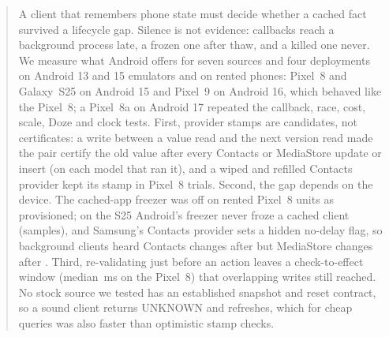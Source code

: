 \begin{abstract}
A client that remembers phone state must decide whether a cached fact survived a lifecycle gap. Silence is not evidence: callbacks reach a background process late, a frozen one after thaw, and a killed one never. We measure what Android offers for seven sources and four deployments on Android 13 and 15 emulators and on rented phones: Pixel~8 and Galaxy~S25 on Android 15 and Pixel~9 on Android 16, which behaved like the Pixel~8; a Pixel~8a on Android 17 repeated the callback, race, cost, scale, Doze and clock tests. First, provider stamps are candidates, not certificates: a write between a value read and the next version read made the pair certify the old value after every Contacts or MediaStore update or insert (\PhysRaceStampedStale on each model that ran it), and a wiped and refilled Contacts provider kept its stamp in \PhysResetSameStamp Pixel~8 trials. Second, the gap depends on the device. The cached-app freezer was off on \PhysFreezerOffTrialUnits rented Pixel~8 units as provisioned; on the S25 Android's freezer never froze a cached client (\PhysSamsungLongAndroidFrozen samples), and Samsung's Contacts provider sets a hidden no-delay flag, so background clients heard Contacts changes after \PhysSamsungBgMedian but MediaStore changes after \PhysSamsungMediaBgMedian. Third, re-validating just before an action leaves a check-to-effect window (median \PhysCteMsInt\,ms on the Pixel~8) that overlapping writes still reached. No stock source we tested has an established snapshot and reset contract, so a sound client returns UNKNOWN and refreshes, which for cheap queries was also faster than optimistic stamp checks.
\end{abstract}
